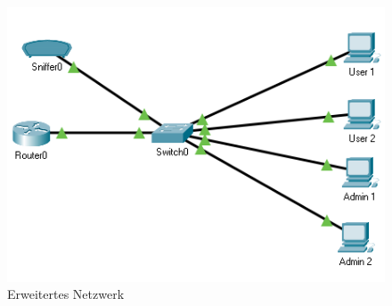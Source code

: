 \begin{figure}[!htb]
    \centering
    \includegraphics[width=\textwidth,height=.85\textwidth,keepaspectratio]{./img/build.png}
    \caption{Erweitertes Netzwerk}
\end{figure}